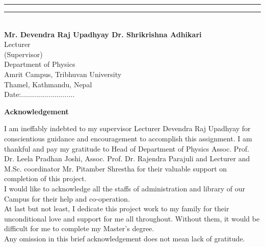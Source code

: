 \documentclass[12pt,a4paper]{report}
\begin{document}
\noindent\rule{180pt}{1pt} \hspace{2cm}\rule{180pt}{1pt}\\
{ \bfseries Mr. Devendra Raj Upadhyay \hspace{2cm} Dr. Shrikrishna Adhikari}\\
Lecturer\\
(Supervisor)\\
Department of Physics\\
Amrit Campus, Tribhuvan University\\
Thamel, Kathmandu, Nepal\\[2cm]
Date:...........................

\cleardoublepage
{}
\begin{center}
	\Large{\bfseries Acknowledgement}
\end{center}

I am ineffably indebted to my supervisor Lecturer Devendra Raj Upadhyay for conscientious guidance and encouragement to accomplish this assignment. I am thankful and pay my gratitude to Head of Department of Physics Assoc. Prof. Dr. Leela Pradhan Joshi,  Assoc. Prof. Dr. Rajendra Parajuli and Lecturer and  M.Sc. coordinator Mr. Pitamber Shrestha for their valuable support on completion of this project.\\
I would like to acknowledge all the staffs of administration and library of our Campus for their help and co-operation.\\
At last but not least, I dedicate this project work to my family for their unconditional love and support for me all throughout. Without them, it would be difficult for me to complete my Master's degree.\\
Any omission in this brief acknowledgement does not mean lack of gratitude.
\end{document}
